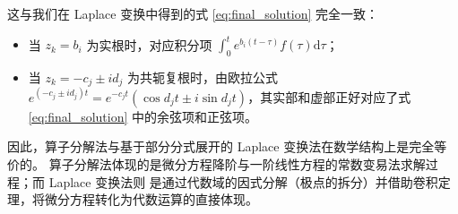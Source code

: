 \documentclass[11pt,a4paper]{ctexart}
\newcommand{\dd}{\mathrm{d}}
\begin{document}
这与我们在 Laplace 变换中得到的式 \eqref{eq:final_solution} 完全一致：
\begin{itemize}
    \item 当 \(z_k = b_i\) 为实根时，对应积分项 \(\int_{0}^{t} e^{b_i(t-\tau)} f(\tau) \dd \tau\)；
    \item 当 \(z_k = -c_j \pm i d_j\) 为共轭复根时，由欧拉公式 \(e^{(-c_j \pm i d_j)t} = e^{-c_j t}(\cos d_j t \pm i \sin d_j t)\)，其实部和虚部正好对应了式 \eqref{eq:final_solution} 中的余弦项和正弦项。
\end{itemize}

因此，算子分解法与基于部分分式展开的 Laplace 变换法在数学结构上是完全等价的。
算子分解法体现的是微分方程降阶与一阶线性方程的常数变易法求解过程；而 Laplace 变换法则
是通过代数域的因式分解（极点的拆分）并借助卷积定理，将微分方程转化为代数运算的直接体现。
\end{document}
